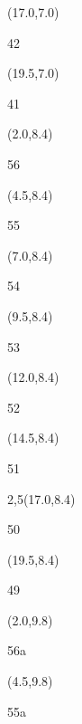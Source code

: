 \documentclass[a4paper]{article}
\newcommand{\myseat}[5]{%
\vspace{-0.1cm} \hspace{-0.5cm}
\parbox[t][2.2cm][t]{3.5cm}{%
\small #1 %
\begin{description}
\vspace{-0.1cm}
\item [ID:] #2
\vspace{-0.1cm}
\item [Team:] #3 \normalsize
\vspace{-0.1cm}
\item \normalsize #4 #5
\vspace{-0.1cm}
\end{description}
}
}
\begin{document}
\begin{CJK}{UTF8}{cyberbit}
\begin{textblock}{2.5}(17.0,7.0)
\textblockcolor{}
\myseat{42}{}{}{}{}
\end{textblock}

\begin{textblock}{2.5}(19.5,7.0)
\textblockcolor{}
\myseat{41}{}{}{}{}
\end{textblock}


\begin{textblock}{2.5}(2.0,8.4)
\textblockcolor{}
\myseat{56}{}{}{}{}
\end{textblock}

\begin{textblock}{2.5}(4.5,8.4)
\textblockcolor{}
\myseat{55}{}{}{}{}
\end{textblock}

\begin{textblock}{2.5}(7.0,8.4)
\textblockcolor{}
\myseat{54}{}{}{}{}
\end{textblock}

\begin{textblock}{2.5}(9.5,8.4)
\textblockcolor{}
\myseat{53}{}{}{}{}
\end{textblock}

\begin{textblock}{2.5}(12.0,8.4)
\textblockcolor{}
\myseat{52}{}{}{}{}
\end{textblock}

\begin{textblock}{2.5}(14.5,8.4)
\textblockcolor{}
\myseat{51}{}{}{}{}
\end{textblock}

\begin{textblock}{2,5}(17.0,8.4)
\textblockcolor{}
\myseat{50}{}{}{}{}
\end{textblock}

\begin{textblock}{2.5}(19.5,8.4)
\textblockcolor{}
\myseat{49}{}{}{}{}
\end{textblock}


\begin{textblock}{2.5}(2.0,9.8)
\textblockcolor{}
\myseat{56a}{}{}{}{}
\end{textblock}

\begin{textblock}{2.5}(4.5,9.8)
\textblockcolor{}
\myseat{55a}{}{}{}{}
\end{textblock}


\end{CJK}
\end{document}
